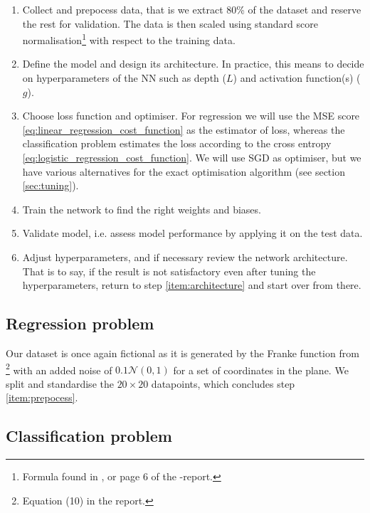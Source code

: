     \begin{enumerate}[label=(\roman*)]
        \item\label{item:prepocess} Collect and prepocess data, that is we extract 80\% of the dataset and reserve the rest for validation. The data is then scaled using standard score normalisation\footnote{Formula found in \cite{mhjensen}, or page 6 of the \projectOne-report.} with respect to the training data.
        \item\label{item:architecture} Define the model and design its architecture. In practice, this means to decide on hyperparameters of the NN such as depth ($L$) and activation function(s) ($g$).
        \item\label{item:optimiser} Choose loss function and optimiser. For regression we will use the MSE score \eqref{eq:linear_regression_cost_function} as the estimator of loss, whereas the classification problem estimates the loss according to the cross entropy \eqref{eq:logistic_regression_cost_function}. We will use SGD as optimiser, but we have various alternatives for the exact optimisation algorithm (see section \ref{sec:tuning}).
        \item\label{item:train} Train the network to find the right weights and biases.
        \item\label{item:assess} Validate model, i.e. assess model performance by applying it on the test data.
        \item\label{item:review} Adjust hyperparameters, and if necessary review the network architecture. That is to say, if the result is not satisfactory even after tuning the hyperparameters, return to step \ref{item:architecture} and start over from there. 
    \end{enumerate}

    

\subsection{Regression problem}\label{sec:analysis_regression}


    Our dataset is once again fictional as it is generated by the Franke function from \projectOne\footnote{Equation (10) in the report.} with an added noise of $0.1 \mathcal{N}(0, 1)$ for a set of coordinates in the plane. We split and standardise the $20\times 20$ datapoints, which concludes step \ref{item:prepocess}. 






\subsection{Classification problem}\label{sec:analysis_classification}



